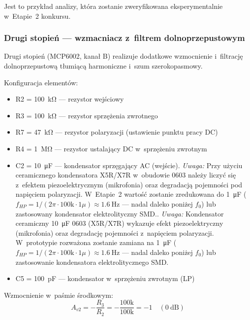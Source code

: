 \documentclass[a4paper,11pt]{article}
\begin{document}
Jest to przykład analizy, która zostanie zweryfikowana eksperymentalnie
w~Etapie~2 konkursu.

\subsubsection{Drugi stopień --- wzmacniacz z~filtrem dolnoprzepustowym}

Drugi stopień (MCP6002, kanał B) realizuje dodatkowe wzmocnienie
i~filtrację dolnoprzepustową tłumiącą harmoniczne i~szum szerokopasmowy.

Konfiguracja elementów:
\begin{itemize}[nosep]
    \item R2 = \SI{100}{\kilo\ohm} --- rezystor wejściowy
    \item R3 = \SI{100}{\kilo\ohm} --- rezystor sprzężenia zwrotnego
    \item R7 = \SI{47}{\kilo\ohm} --- rezystor polaryzacji (ustawienie punktu pracy DC)
    \item R4 = \SI{1}{\mega\ohm} --- rezystor ustalający DC w~sprzężeniu zwrotnym
    \item C2 = \SI{10}{\micro\farad} --- kondensator sprzęgający AC (wejście).
          \textit{Uwaga:} Przy użyciu ceramicznego kondensatora X5R/X7R
          w~obudowie 0603 należy liczyć się z~efektem piezoelektrycznym
          (mikrofonia) oraz degradacją pojemności pod napięciem polaryzacji.
          W~Etapie~2 wartość zostanie zredukowana do \SI{1}{\micro\farad}
          ($f_{HP} = 1/(2\pi \cdot 100\text{k} \cdot 1\mu) \approx \SI{1,6}{\hertz}$
          --- nadal daleko poniżej $f_0$) lub zastosowany kondensator
          elektrolityczny SMD..
          \textit{Uwaga:} Kondensator ceramiczny \SI{10}{\micro\farad} 0603 (X5R/X7R)
          wykazuje efekt piezoelektryczny (mikrofonia) oraz degradację pojemności
          z~napięciem polaryzacji. W~prototypie rozważona zostanie zamiana na
          \SI{1}{\micro\farad} ($f_{HP} = 1/(2\pi \cdot 100\text{k} \cdot 1\mu) \approx \SI{1,6}{\hertz}$
          --- nadal daleko poniżej $f_0$) lub zastosowanie kondensatora
          elektrolitycznego SMD.
    \item C5 = \SI{100}{\pico\farad} --- kondensator w~sprzężeniu zwrotnym (LP)
\end{itemize}

Wzmocnienie w~paśmie środkowym:
\begin{equation}
    A_{v2} = -\frac{R_3}{R_2} = -\frac{100\text{k}}{100\text{k}} = -1 \quad (\SI{0}{\deci\bel})
    \label{eq:gain2}
\end{equation}
\end{document}
